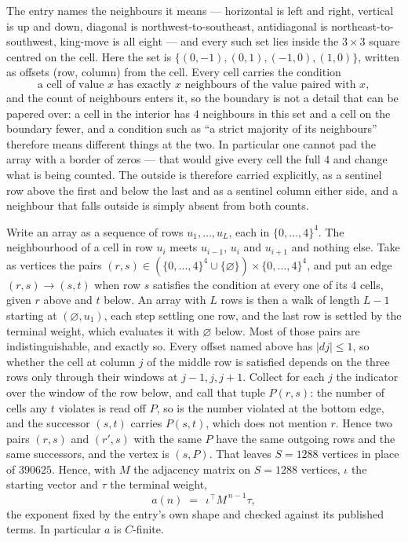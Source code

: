 \documentclass[11pt,a4paper]{article}
\theoremstyle{plain}
\theoremstyle{definition}
\begin{document}
The entry names the neighbours it means --- horizontal is left and right, vertical is up and
down, diagonal is northwest-to-southeast, antidiagonal is northeast-to-southwest, king-move is
all eight --- and every such set lies inside the $3\times3$ square centred on the cell. Here
the set is $\{(0,-1), (0,1), (-1,0), (1,0)\}$, written as offsets (row, column) from the cell. Every cell carries
the condition
\[
\text{a cell of value }x\text{ has exactly }x\text{ neighbours of the value paired with }x,
\]
and the count of neighbours enters it, so the boundary is not a detail that can be papered
over: a cell in the interior has $4$ neighbours in this set and a cell on the boundary
fewer, and a condition such as ``a strict majority of its neighbours'' therefore means
different things at the two. In particular one cannot pad the array with a border of zeros ---
that would give every cell the full $4$ and change what is being counted. The outside is
therefore carried
explicitly, as a sentinel row above the first and below the last and as a sentinel column
either side, and a neighbour that falls outside is simply absent from both counts.

Write an array as a sequence of rows $u_1,\dots,u_L$, each in
$\{0,\dots,4\}^{4}$. The neighbourhood of a cell in row $u_i$ meets $u_{i-1}$,
$u_i$ and $u_{i+1}$ and nothing else. Take as vertices the pairs
$(r,s)\in(\{0,\dots,4\}^{4}\cup\{\varnothing\})\times\{0,\dots,4\}^{4}$,
and put an edge $(r,s)\to(s,t)$ when row $s$ satisfies the condition at every one of its
$4$ cells, given $r$ above and $t$ below. An array with $L$ rows is then a walk of length
$L-1$ starting at $(\varnothing,u_1)$, each step settling one row, and the last row is
settled by the terminal weight, which evaluates it with $\varnothing$ below. Most of those pairs are indistinguishable, and exactly so. Every offset named above has $|dj|\le 1$, so whether the cell at column $j$ of the middle row is satisfied depends on the three rows only through their windows at $j-1,j,j+1$. Collect for each $j$ the indicator over the window of the row below, and call that tuple $P(r,s)$: the number of cells any $t$ violates is read off $P$, so is the number violated at the bottom edge, and the successor $(s,t)$ carries $P(s,t)$, which does not mention $r$. Hence two pairs $(r,s)$ and $(r',s)$ with the same $P$ have the same outgoing rows and the same successors, and the vertex is $(s,P)$. That leaves $S=1288$ vertices in place of $390625$. Hence,
with $M$ the adjacency matrix on $S=1288$ vertices, $\iota$ the starting vector and $\tau$ the
terminal weight,
\[
a(n)\;=\;\,\iota^{\!\top}M^{\,n-1}\tau ,
\]
the exponent fixed by the entry's own shape and checked against its published terms. In
particular $a$ is $C$-finite.
\end{document}
